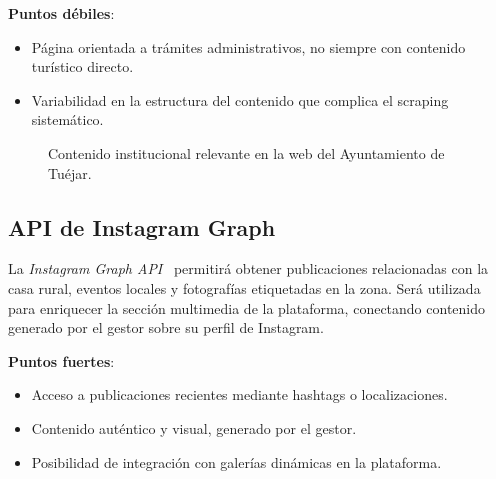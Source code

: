 \textbf{Puntos débiles}:
\begin{itemize}
    \item Página orientada a trámites administrativos, no siempre con contenido turístico directo.
    \item Variabilidad en la estructura del contenido que complica el scraping sistemático.
\end{itemize}

\begin{figure}[h!tb]
    \centering
    \setlength{\fboxsep}{15pt}%
    \setlength{\fboxrule}{0.5pt}%
    \caption{Contenido institucional relevante en la web del Ayuntamiento de Tuéjar.}
    \label{fig:ayto-web}
\end{figure}

\subsection{API de Instagram Graph}
La \textit{Instagram Graph API}~\cite{instagram-graph-api} permitirá obtener publicaciones relacionadas con la casa rural, eventos locales y fotografías etiquetadas en la zona. Será utilizada para enriquecer la sección multimedia de la plataforma, conectando contenido generado por el gestor sobre su perfil de Instagram.

\textbf{Puntos fuertes}:
\begin{itemize}
    \item Acceso a publicaciones recientes mediante hashtags o localizaciones.
    \item Contenido auténtico y visual, generado por el gestor.
    \item Posibilidad de integración con galerías dinámicas en la plataforma.
\end{itemize}

